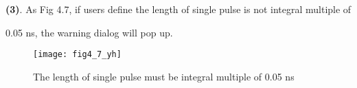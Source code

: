 \vspace{0.4cm}
\noindent \textbf{(3)}. As Fig 4.7, if users define the length of single pulse is not integral multiple of

\hspace{0cm}0.05 ns, the warning dialog will pop up.

\vspace{0.2cm}
\begin{figure}[H]
\centering
\texttt{[image: fig4\_7\_yh]}
\caption{\hspace{0.2cm}The length of single pulse must be integral multiple of 0.05 ns}
\end{figure}

%





